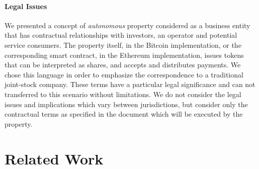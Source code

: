 \paragraph{Legal Issues}
We presented a concept of \emph{autonomous} property considered as a business entity that has contractual relationships with investors, an operator and potential service consumers. The property itself, in the Bitcoin implementation, or the corresponding smart contract, in the Ethereum implementation, issues tokens that can be interpreted as shares, and accepts and distributes payments. We chose this language in order to emphasize the correspondence to a traditional joint-stock company. These terms have a particular legal significance and can not transferred to this scenario without limitations. We do not consider the legal issues and implications which vary between jurisdictions, but consider only the contractual terms as specified in the document which will be executed by the property.

\section{Related Work}

